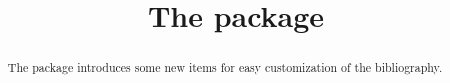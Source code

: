 \documentclass[a4paper]{article}
\title{The package \package{easybib}}
\begin{document}
\maketitle
\begin{abstract}
  The package 
%
%
  introduces some new items for easy customization of the
  bibliography.
\end{abstract}

\tableofcontents

\vfill
\clearpage

\pagestyle{fpage}
\def\sectionmark#1{\markboth{The package \package{easybib}}{The package \package{easybib}}}
\let\chaptermark\sectionmark
\let\subsectionmark\sectionmark
\end{document}
